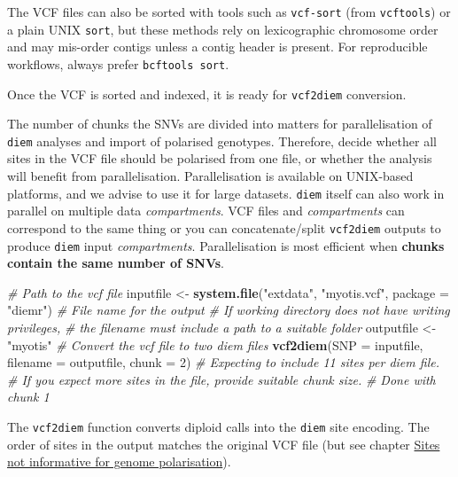 \documentclass[
]{book}
\newenvironment{Shaded}{\begin{snugshade}}{\end{snugshade}}
\newcommand{\AttributeTok}[1]{\textcolor[rgb]{0.13,0.29,0.53}{#1}}
\newcommand{\CommentTok}[1]{\textcolor[rgb]{0.56,0.35,0.01}{\textit{#1}}}
\newcommand{\DecValTok}[1]{\textcolor[rgb]{0.00,0.00,0.81}{#1}}
\newcommand{\FunctionTok}[1]{\textcolor[rgb]{0.13,0.29,0.53}{\textbf{#1}}}
\newcommand{\NormalTok}[1]{#1}
\newcommand{\OtherTok}[1]{\textcolor[rgb]{0.56,0.35,0.01}{#1}}
\newcommand{\StringTok}[1]{\textcolor[rgb]{0.31,0.60,0.02}{#1}}
\begin{document}
The VCF files can also be sorted with tools such as \texttt{vcf-sort} (from \texttt{vcftools}) or a plain UNIX \texttt{sort}, but these methods rely on lexicographic chromosome order and may mis-order contigs unless a contig header is present. For reproducible workflows, always prefer \texttt{bcftools\ sort}.

Once the VCF is sorted and indexed, it is ready for \texttt{vcf2diem} conversion.

The number of chunks the SNVs are divided into matters for parallelisation of \texttt{diem} analyses and import of polarised genotypes. Therefore, decide whether all sites in the VCF file should be polarised from one file, or whether the analysis will benefit from parallelisation. Parallelisation is available on UNIX-based platforms, and we advise to use it for large datasets. \texttt{diem} itself can also work in parallel on multiple data \emph{compartments}. VCF files and \emph{compartments} can correspond to the same thing or you can concatenate/split \texttt{vcf2diem} outputs to produce \texttt{diem} input \emph{compartments}. Parallelisation is most efficient when \textbf{chunks contain the same number of SNVs}.

\begin{Shaded}
\begin{Highlighting}[]
\CommentTok{\# Path to the vcf file}
\NormalTok{inputfile }\OtherTok{\textless{}{-}} \FunctionTok{system.file}\NormalTok{(}\StringTok{"extdata"}\NormalTok{, }\StringTok{"myotis.vcf"}\NormalTok{, }\AttributeTok{package =} \StringTok{"diemr"}\NormalTok{)}
\CommentTok{\# File name for the output}
\CommentTok{\# If working directory does not have writing privileges, }
\CommentTok{\# the filename must include a path to a suitable folder}
\NormalTok{outputfile }\OtherTok{\textless{}{-}} \StringTok{"myotis"}
\CommentTok{\# Convert the vcf file to two diem files}
\FunctionTok{vcf2diem}\NormalTok{(}\AttributeTok{SNP =}\NormalTok{ inputfile, }\AttributeTok{filename =}\NormalTok{ outputfile, }\AttributeTok{chunk =} \DecValTok{2}\NormalTok{)}
\CommentTok{\# Expecting to include 11 sites per diem file.}
\CommentTok{\# If you expect more sites in the file, provide suitable chunk size.}
\CommentTok{\# Done with chunk 1}
\end{Highlighting}
\end{Shaded}

The \texttt{vcf2diem} function converts diploid calls into the \texttt{diem} site encoding. The order of sites in the output matches the original VCF file (but see chapter \hyperref[sites-not-informative-for-genome-polarisation]{Sites not informative for genome polarisation}).
\end{document}
